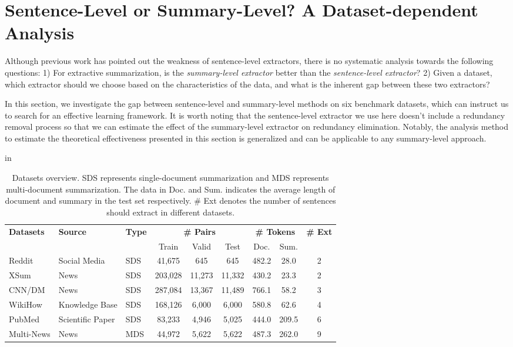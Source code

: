 \documentclass[11pt,a4paper]{article}
\begin{document}
\section{Sentence-Level or Summary-Level? A Dataset-dependent Analysis}
\label{sec:investigation}



Although previous work has pointed out the weakness of sentence-level extractors, there is no systematic analysis towards the following questions:
1) For extractive summarization, is the \emph{summary-level extractor} better than the \emph{sentence-level extractor}?
2) Given a dataset, which extractor should we choose based on the characteristics of the data, and what is the inherent gap between these two extractors?

In this section, we investigate the gap between sentence-level and summary-level methods on six benchmark datasets, which can instruct us to search for an effective learning framework. It is worth noting that the sentence-level extractor we use here doesn't include a redundancy removal process so that we can estimate the effect of the summary-level extractor on redundancy elimination.
Notably, the analysis method to estimate the theoretical effectiveness presented in this section is generalized and can be applicable to any summary-level approach.



\renewcommand\arraystretch{1.1}
\begin{table*}[t]
    \center \footnotesize
     in
    \begin{tabular}{lllcccccc}
    \toprule
    \multicolumn{1}{l}{\multirow{2}[1]{*}{\textbf{Datasets}}} &
    \multicolumn{1}{l}{\multirow{2}[1]{*}{\textbf{Source}}} &
    \multicolumn{1}{c}{\multirow{2}[1]{*}{\textbf{Type}}} & \multicolumn{3}{c}{\textbf{\# Pairs}} &
    \multicolumn{2}{c}{\textbf{\# Tokens}} &
    \multicolumn{1}{l}{\multirow{2}[1]{*}{\textbf{\# Ext}}} \\
     & & & Train & Valid & Test & Doc. & Sum. & \\
    \midrule
    Reddit &  Social Media & SDS & 41,675 & 645 & 645 &  482.2 & 28.0 & 2\\
    XSum  &  News  & SDS & 203,028 & 11,273 & 11,332 & 430.2 & 23.3 & 2\\
    CNN/DM &  News  & SDS & 287,084 & 13,367 & 11,489 & 766.1 & 58.2 & 3 \\
    WikiHow & Knowledge Base & SDS &  168,126 & 6,000 & 6,000 & 580.8 & 62.6 & 4\\
    PubMed &  Scientific Paper & SDS & 83,233 & 4,946 & 5,025 & 444.0 & 209.5 & 6\\
    Multi-News &  News  & MDS & 44,972 & 5,622 & 5,622 & 487.3 & 262.0 & 9\\
    \bottomrule
    \end{tabular}\caption{Datasets overview. SDS represents single-document summarization and MDS represents multi-document summarization. The data in Doc. and Sum. indicates the average length of document and summary in the test set respectively. \# Ext denotes the number of sentences should extract in different datasets.}
  \label{tab:datasets}\end{table*}
\end{document}
